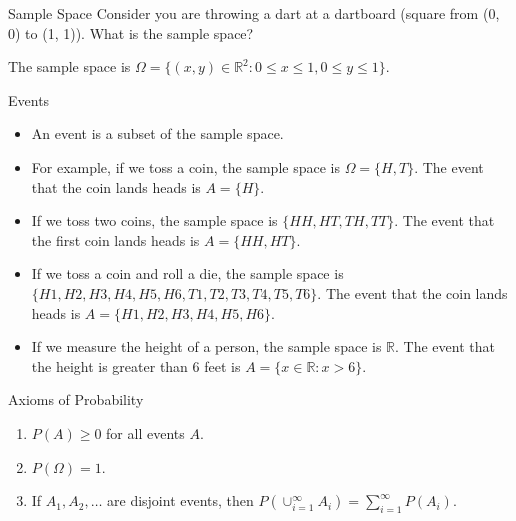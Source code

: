 \documentclass[handout]{beamer}
\begin{document}
\begin{frame}{Sample Space}
    Consider you are throwing a dart at a dartboard (square from (0, 0) to (1, 1)). What is the sample space?

    \begin{figure}[h]
    \centering
    \end{figure}

    The sample space is $\Omega = \{(x, y) \in \mathbb{R}^2: 0 \leq x \leq 1, 0 \leq y \leq 1\}$.


    
\end{frame}

\begin{frame}{Events}

\begin{itemize}
\item An event is a subset of the sample space.
\item For example, if we toss a coin, the sample space is  $\Omega = \{H, T\}$. The event that the coin lands heads is $A = \{H\}$.
\item If we toss two coins, the sample space is $\{HH, HT, TH, TT\}$. The event that the first coin lands heads is $A = \{HH, HT\}$.
\item If we toss a coin and roll a die, the sample space is $\{H1, H2, H3, H4, H5, H6, T1, T2, T3, T4, T5, T6\}$. The event that the coin lands heads is $A = \{H1, H2, H3, H4, H5, H6\}$.
\item If we measure the height of a person, the sample space is $\mathbb{R}$. The event that the height is greater than 6 feet is $A = \{x \in \mathbb{R}: x > 6\}$.
\end{itemize}
    
\end{frame}
\begin{frame}{Axioms of Probability}
    \begin{enumerate}
        \item $P(A) \geq 0$ for all events $A$.
        \item $P(\Omega) = 1$.
        \item If $A_1, A_2, \ldots$ are disjoint events, then $P(\cup_{i=1}^{\infty} A_i) = \sum_{i=1}^{\infty} P(A_i)$.
    \end{enumerate}
    
\end{frame}
\end{document}
